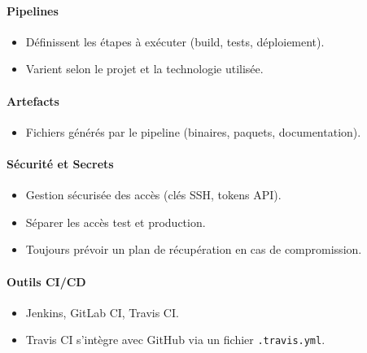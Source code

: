 \documentclass{article}
\begin{document}
\paragraph{Pipelines}
\begin{itemize}
    \item Définissent les étapes à exécuter (build, tests, déploiement).
    \item Varient selon le projet et la technologie utilisée.
\end{itemize}

\paragraph{Artefacts}
\begin{itemize}
    \item Fichiers générés par le pipeline (binaires, paquets, documentation).
\end{itemize}

\paragraph{Sécurité et Secrets}
\begin{itemize}
    \item Gestion sécurisée des accès (clés SSH, tokens API).
    \item Séparer les accès test et production.
    \item Toujours prévoir un plan de récupération en cas de compromission.
\end{itemize}

\paragraph{Outils CI/CD}
\begin{itemize}
    \item Jenkins, GitLab CI, Travis CI.
    \item Travis CI s’intègre avec GitHub via un fichier \texttt{.travis.yml}.
\end{itemize}
\end{document}
